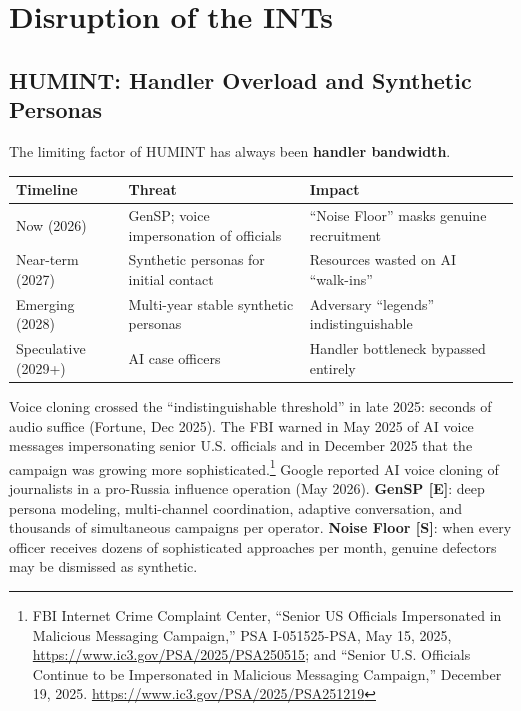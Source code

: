 \documentclass[11pt,letterpaper]{article}
\begin{document}
\vspace{0.8cm}

\section{Disruption of the INTs}

\subsection{HUMINT: Handler Overload and Synthetic Personas}

The limiting factor of HUMINT has always been \textbf{handler bandwidth}.

\begin{center}
\small
\begin{tabularx}{\linewidth}{ZY{0.69}Y{1.04}Y{1.27}}
\toprule
\textbf{Timeline} & \textbf{Threat} & \textbf{Impact} \\
\midrule
Now (2026) & GenSP; voice impersonation of officials & ``Noise Floor'' masks genuine recruitment \\
Near-term (2027) & Synthetic personas for initial contact & Resources wasted on AI ``walk-ins'' \\
Emerging (2028) & Multi-year stable synthetic personas & Adversary ``legends'' indistinguishable \\
Speculative (2029+) & AI case officers & Handler bottleneck bypassed entirely \\
\bottomrule
\end{tabularx}
\end{center}

\begin{criticalbox}
Voice cloning crossed the ``indistinguishable threshold'' in late 2025: seconds of audio suffice (Fortune, Dec 2025). The FBI warned in May 2025 of AI voice messages impersonating senior U.S. officials and in December 2025 that the campaign was growing more sophisticated.\footnote{FBI Internet Crime Complaint Center, ``Senior US Officials Impersonated in Malicious Messaging Campaign,'' PSA I-051525-PSA, May 15, 2025, \url{https://www.ic3.gov/PSA/2025/PSA250515}; and ``Senior U.S. Officials Continue to be Impersonated in Malicious Messaging Campaign,'' December 19, 2025. \url{https://www.ic3.gov/PSA/2025/PSA251219}} Google reported AI voice cloning of journalists in a pro-Russia influence operation (May 2026). \textbf{GenSP [E]}: deep persona modeling, multi-channel coordination, adaptive conversation, and thousands of simultaneous campaigns per operator. \textbf{Noise Floor [S]}: when every officer receives dozens of sophisticated approaches per month, genuine defectors may be dismissed as synthetic.
\end{criticalbox}
\end{document}

